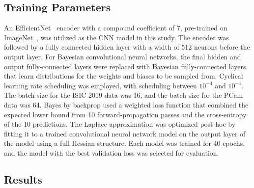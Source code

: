 \subsection{Training Parameters}
An EfficientNet~\citep{tan2019efficient} encoder with a compound coefficient of 7, pre-trained on ImageNet~\citep{deng2009imagenet}, was utilized as the CNN model in this study. The encoder was followed by a fully connected hidden layer with a width of 512 neurons before the output layer. For Bayesian convolutional neural networks, the final hidden and output fully-connected layers were replaced with Bayesian fully-connected layers that learn distributions for the weights and biases to be sampled from. Cyclical learning rate scheduling was employed, with scheduling between $10^{-4}$ and $10^{-1}$. The batch size for the ISIC 2019 data was 16, and the batch size for the PCam data was 64. Bayes by backprop used a weighted loss function that combined the expected lower bound from 10 forward-propagation passes and the cross-entropy of the 10 predictions. The Laplace approximation was optimized post-hoc by fitting it to a trained convolutional neural network model on the output layer of the model using a full Hessian structure. Each model was trained for 40 epochs, and the model with the best validation loss was selected for evaluation.


\subsection{Results}
\label{subsec:calibration_results}

